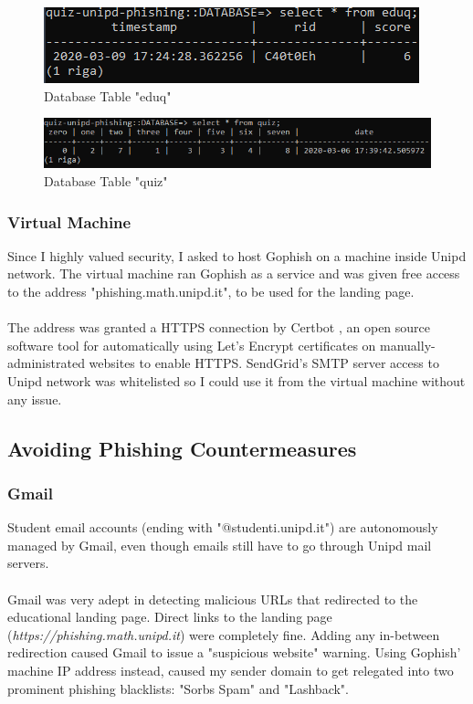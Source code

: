 \documentclass[a4paper]{article}
\begin{document}
\begin{figure}[H]
	\centering
	\includegraphics[scale=0.7]{images/tools/database-eduq.PNG}
	\caption{Database Table "eduq"}
	\label{heroku-eduq}
\end{figure}

\begin{figure}[H]
	\centering
	\includegraphics[scale=0.5]{images/tools/database-quiz.PNG}
	\caption{Database Table "quiz"}
	\label{heroku-quiz}
\end{figure}

\subsubsection{Virtual Machine}

Since I highly valued security, I asked to host Gophish on a machine inside Unipd network. The virtual machine ran Gophish as a service and was given free access to the address "phishing.math.unipd.it", to be used for the landing page. 
\\ \\
The address was granted a HTTPS connection by Certbot \cite{tools-certbot}, an open source software tool for automatically using Let’s Encrypt certificates on manually-administrated websites to enable HTTPS. SendGrid's SMTP server access to Unipd network was whitelisted so I could use it from the virtual machine without any issue.

\subsection{Avoiding Phishing Countermeasures}

\subsubsection{Gmail}

Student email accounts (ending with "@studenti.unipd.it") are autonomously managed by Gmail, even though emails still have to go through Unipd mail servers. 
\\ \\
Gmail was very adept in detecting malicious URLs that redirected to the educational landing page. Direct links to the landing page (\textit{https://phishing.math.unipd.it}) were completely fine. Adding any in-between redirection caused Gmail to issue a "suspicious website" warning. Using Gophish' machine IP address instead, caused my sender domain to get relegated into two prominent phishing blacklists: "Sorbs Spam" and "Lashback".
\end{document}
